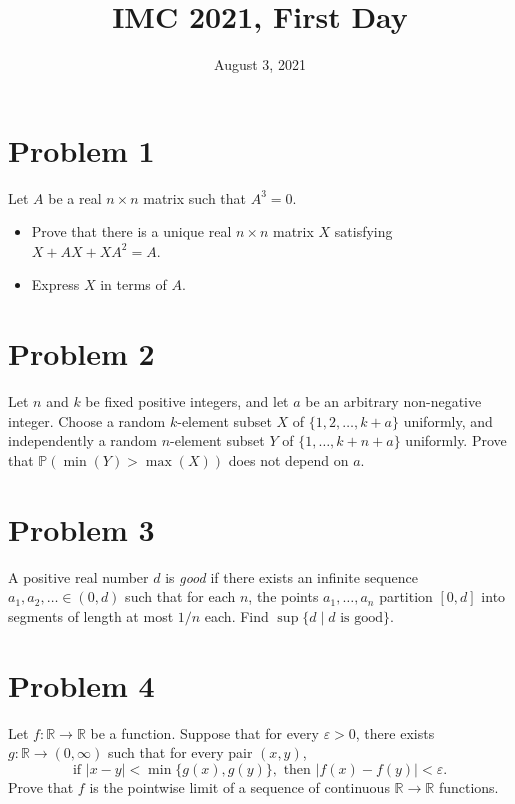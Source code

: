 \documentclass{article}
\title{IMC 2021, First Day}
\date{August 3, 2021}
\begin{document}
\maketitle

\section*{Problem 1}
Let $A$ be a real $n \times n$ matrix such that $A^3 = 0$.
\begin{itemize}
\item[(a)] Prove that there is a unique real $n \times n$ matrix $X$ satisfying $X + AX + XA^2 = A$.
\item[(b)] Express $X$ in terms of $A$.
\end{itemize}

\section*{Problem 2}
Let $n$ and $k$ be fixed positive integers, and let $a$ be an arbitrary non-negative integer. Choose a random $k$-element subset $X$ of $\{1, 2, \ldots, k+a\}$ uniformly, and independently a random $n$-element subset $Y$ of $\{1, \ldots, k+n+a\}$ uniformly. Prove that $\mathbb{P}(\min(Y) > \max(X))$ does not depend on $a$.

\section*{Problem 3}
A positive real number $d$ is \emph{good} if there exists an infinite sequence $a_1, a_2, \ldots \in (0, d)$ such that for each $n$, the points $a_1, \ldots, a_n$ partition $[0, d]$ into segments of length at most $1/n$ each. Find $\sup\{d \mid d \text{ is good}\}$.

\section*{Problem 4}
Let $f: \mathbb{R} \to \mathbb{R}$ be a function. Suppose that for every $\varepsilon > 0$, there exists $g: \mathbb{R} \to (0, \infty)$ such that for every pair $(x, y)$,
\[ \text{if } |x - y| < \min\{g(x), g(y)\}, \text{ then } |f(x) - f(y)| < \varepsilon. \]
Prove that $f$ is the pointwise limit of a sequence of continuous $\mathbb{R} \to \mathbb{R}$ functions.
\end{document}
